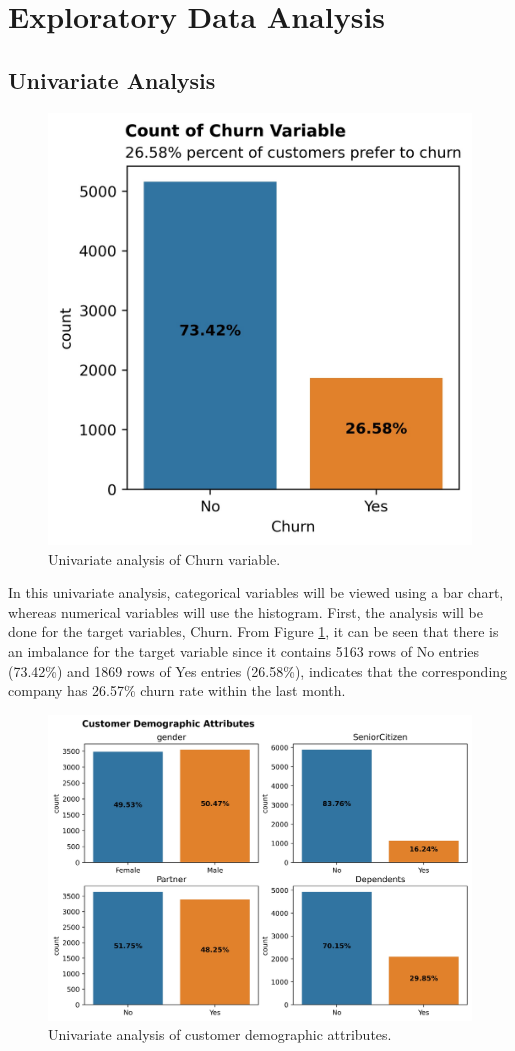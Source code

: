 \section{Exploratory Data Analysis}
\subsection{Univariate Analysis}

\begin{figure}[tbph]
	\centering
	\includegraphics[width=0.5\linewidth]{figures/churn_univariate}
	\caption{Univariate analysis of Churn variable.}
	\label{fig:churn_univariate}
\end{figure}

In this univariate analysis, categorical variables will be viewed using a bar chart, whereas numerical variables will use the histogram. First, the analysis will be done for the target variables, Churn. From Figure \ref{fig:churn_univariate}, it can be seen that there is an imbalance for the target variable since it contains 5163 rows of No entries (73.42\%) and 1869 rows of Yes entries (26.58\%), indicates that the corresponding company has 26.57\% churn rate within the last month.
\begin{figure}[tbph]
	\centering
	\includegraphics[width=1\linewidth]{figures/customer_demo}
	\caption{Univariate analysis of customer demographic attributes.}
	\label{fig:customer_demo}
\end{figure}

